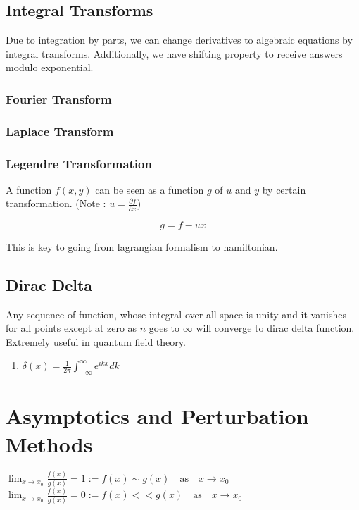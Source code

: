 \documentclass{report}
\begin{document}
\section{Integral Transforms}
Due to integration by parts, we can change derivatives to algebraic equations by integral transforms. Additionally, we have shifting property to receive answers modulo exponential.

\subsection{Fourier Transform}

\subsection{Laplace Transform}

\subsection{Legendre Transformation}
A function $f(x,y)$ can be seen as a function $g$ of $u$ and $y$ by certain transformation. (Note : $u=\frac{\partial f}{\partial x}$)

$$g = f - ux$$

\noindent This is key to going from lagrangian formalism to hamiltonian.

\section{Dirac Delta}
Any sequence of function, whose integral over all space is unity and it vanishes for all points except at zero as $n$ goes to $\infty$ will converge to dirac delta function. Extremely useful in quantum field theory.

\begin{enumerate}
  \item $\delta(x) = \frac{1}{2\pi}\int_{-\infty}^{\infty} e^{ikx} dk $
\end{enumerate}

\chapter{Asymptotics and Perturbation Methods}

$\lim_{x\to x_0} \frac{f(x)}{g(x)} = 1 := f(x) \sim g(x) \quad\mathrm{as}\quad  x\to x_0$\\

\noindent$\lim_{x\to x_0} \frac{f(x)}{g(x)} = 0 := f(x) << g(x)\quad\mathrm{as}\quad  x\to x_0$\\
\end{document}
